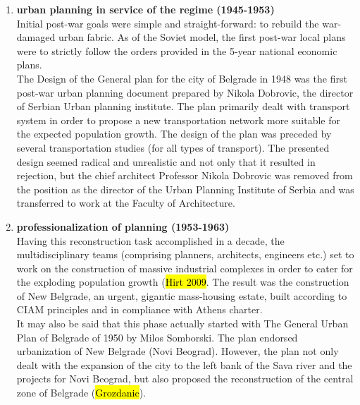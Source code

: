 \documentclass[11pt]{report}
\begin{document}
\begin{enumerate}
\item \textbf{urban planning in service of the regime (1945-1953)}
\\
Initial post-war goals were simple and straight-forward: to rebuild the war-damaged urban fabric. As of the Soviet model, the first post-war local plans were to strictly follow the orders provided in the 5-year national economic plans. 
\\
The Design of the General plan for the city of Belgrade in 1948 was the first post-war urban planning document prepared by Nikola Dobrovic, the director of Serbian Urban planning institute. The plan primarily dealt with transport system in order to propose a new transportation network more suitable for the expected population growth. The design of the plan was preceded by several transportation studies (for all types of transport). The presented design seemed radical and unrealistic and not only that it resulted in rejection, but the chief architect Professor Nikola Dobrovic was removed from the position as the director of the Urban Planning Institute of Serbia and was transferred to work at the Faculty of Architecture.

\item \textbf{professionalization of planning (1953-1963)}
\\
Having this reconstruction task accomplished in a decade, the multidisciplinary teams (comprising planners, architects, engineers etc.) set to work on the construction of massive industrial complexes in order to cater for the exploding population growth (\hl{Hirt 2009}. The result was the construction of New Belgrade, an urgent, gigantic mass-housing estate, built according to CIAM principles and in compliance with Athens charter.
\\
It may also be said that this phase actually started with The  General  Urban  Plan  of  Belgrade of 1950 by Milos Somborski.
The plan endorsed urbanization of New Belgrade (Novi Beograd). However, the plan not only dealt with the expansion of the city to the left bank of the Sava river and the projects for Novi Beograd, but also proposed the reconstruction of the central zone of Belgrade (\hl{Grozdanic}).


\end{enumerate}
\end{document}
